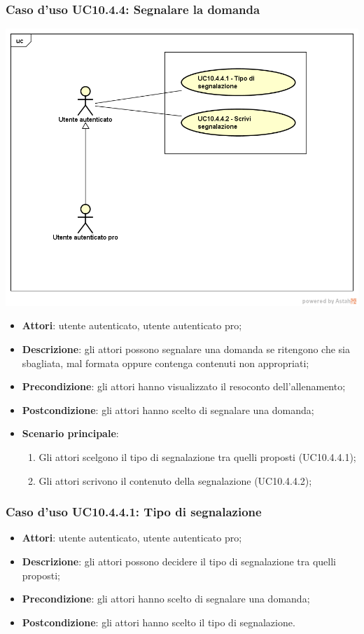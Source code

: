 \subsubsection{Caso d'uso UC10.4.4: Segnalare la domanda}
\begin{center}
	\includegraphics[scale=0.5]{UML/UC10_4_4.png}
\end{center}
	\begin{itemize}
		\item \textbf{Attori}: utente autenticato, utente autenticato pro;
		\item \textbf{Descrizione}: gli attori possono segnalare una domanda se ritengono che sia sbagliata, mal formata oppure contenga contenuti non appropriati;
		\item \textbf{Precondizione}: gli attori hanno visualizzato il resoconto dell'allenamento;
		\item \textbf{Postcondizione}: gli attori hanno scelto di segnalare una domanda;
				\item \textbf{Scenario principale}:
				\begin{enumerate}
					\item Gli attori scelgono il tipo di segnalazione tra quelli proposti (UC10.4.4.1);
					\item Gli attori scrivono il contenuto della segnalazione (UC10.4.4.2);
				\end{enumerate}
	\end{itemize}
\subsubsection{Caso d'uso UC10.4.4.1: Tipo di segnalazione}
	\begin{itemize}
		\item \textbf{Attori}: utente autenticato, utente autenticato pro;
		\item \textbf{Descrizione}: gli attori possono decidere il tipo di segnalazione tra quelli proposti;
		\item \textbf{Precondizione}: gli attori hanno scelto di segnalare una domanda;
		\item \textbf{Postcondizione}: gli attori hanno scelto il tipo di segnalazione.
	\end{itemize}
